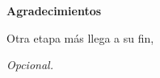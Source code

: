 \cleardoublepage

\thispagestyle{empty}


\begin{center}
  {\bf \Huge Agradecimientos}
\end{center}
\vspace{1cm}
\setlength{\baselineskip}{0.8cm}


Otra etapa más llega a su fin, 
\begin{flushright}
  \textit{Opcional.}
\end{flushright}

